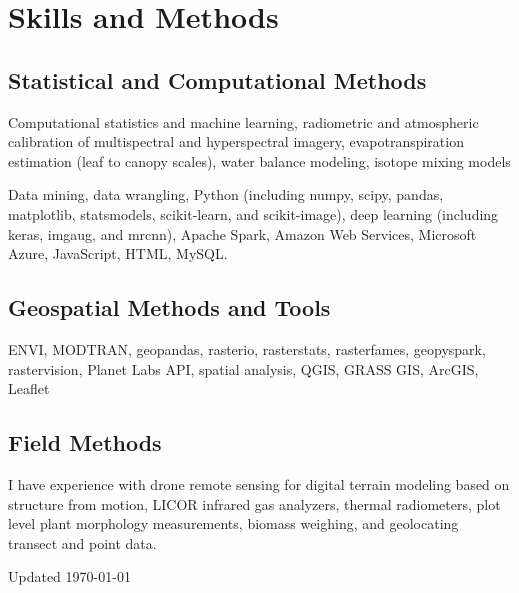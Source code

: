 \documentclass[12pt,letterpaper]{report}
\newcommand{\listitemspace}{0.15em}
\renewenvironment{itemize}
{\begin{list}{}{\setlength{\leftmargin}{0em}
			\setlength{\parskip}{0em}
			\setlength{\itemsep}{\listitemspace}
			\setlength{\parsep}{\listitemspace}}}
	{\end{list}}
\begin{document}
	
	
	\section*{Skills and Methods}
	
	\subsection*{Statistical and Computational Methods}
	
	\begin{itemize}
		
		\item Computational statistics and machine learning, radiometric and atmospheric calibration of multispectral and hyperspectral imagery, evapotranspiration estimation (leaf to canopy scales), water balance modeling, isotope mixing models

                \item Data mining, data wrangling, Python (including numpy, scipy, pandas, matplotlib, statsmodels, scikit-learn, and scikit-image), deep learning (including keras, imgaug, and mrcnn), Apache Spark, Amazon Web Services, Microsoft Azure, JavaScript, HTML, MySQL.
		
	\end{itemize}
	
	\subsection*{Geospatial Methods and Tools}
	
	\begin{itemize}
		
		\item ENVI, MODTRAN, geopandas, rasterio, rasterstats, rasterfames, geopyspark, rastervision, Planet Labs API, spatial analysis, QGIS, GRASS GIS, ArcGIS, Leaflet
		
	\end{itemize}
	
	\subsection*{Field Methods}
	
	\begin{itemize}
		
		\item I have experience with drone remote sensing for digital terrain modeling based on structure from motion, LICOR infrared gas analyzers, thermal radiometers, plot level plant morphology measurements, biomass weighing, and geolocating transect and point data.
		
	\end{itemize}
	
	
	
	\begin{center}
		\vspace{6em}
		Updated \monthyeardate\today
	\end{center}
	
	
	
\end{document}
